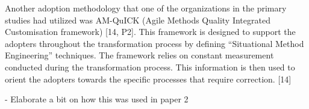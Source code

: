 Another adoption methodology that one of the organizations in the
primary studies had utilized was AM-QuICK (Agile Methods Quality
Integrated Customisation framework) [14, P2]. This framework is designed to
support the adopters throughout the transformation process by defining
``Situational Method Engineering'' techniques. The framework relies on
constant measurement conducted during the transformation process. This
information is then used to orient the adopters towards the specific
processes that require correction. [14]

- Elaborate a bit on how this was used in paper 2
